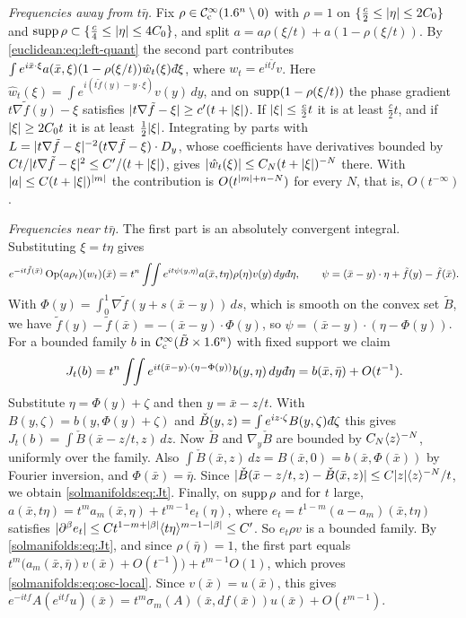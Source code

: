 \emph{Frequencies away from $t\bar\eta$.} Fix $\rho\in\mathcal{C}^\infty_{\mathrm{c}}(1.6^n\setminus0)$ with $\rho=1$ on
$\{\frac c2\le\lvert \eta\rvert\le2C_0\}$ and $\operatorname{supp}\rho\subset\{\frac c4\le\lvert \eta\rvert\le4C_0\}$, and split
$a=a\rho(\xi/t)+a(1-\rho(\xi/t))$. By \eqref{euclidean:eq:left-quant} the second part
contributes $\int e^{i\bar x\cdot\xi}a(\bar x,\xi)(1-\rho(\xi/t))\hat w_t(\xi)\,\dbar\xi$, where
$w_t=e^{it\tilde f}v$. Here $\hat w_t(\xi)=\int e^{i(t\tilde f(y)-y\cdot\xi)}v(y)\,dy$, and on
$\operatorname{supp}(1-\rho(\xi/t))$ the phase gradient $t\nabla \tilde f(y)-\xi$ satisfies
$\lvert t\nabla \tilde f-\xi\rvert\ge c'(t+\lvert \xi\rvert)$. If $\lvert \xi\rvert\le\frac c2t$ it is at least $\frac c2t$, and if
$\lvert \xi\rvert\ge2C_0t$ it is at least $\frac12\lvert \xi\rvert$. Integrating by parts with
$L=\lvert t\nabla \tilde f-\xi\rvert^{-2}(t\nabla \tilde f-\xi)\cdot D_y$, whose coefficients have derivatives
bounded by $Ct/\lvert t\nabla \tilde f-\xi\rvert^2\le C'/(t+\lvert \xi\rvert)$, gives
$\lvert \hat w_t(\xi)\rvert\le C_N(t+\lvert \xi\rvert)^{-N}$ there. With $\lvert a\rvert\le C(t+\lvert \xi\rvert)^{\lvert m\rvert}$ the
contribution is $O(t^{\lvert m\rvert+n-N})$ for every $N$, that is, $O(t^{-\infty})$.

\emph{Frequencies near $t\bar\eta$.} The first part is an absolutely convergent integral.
Substituting $\xi=t\eta$ gives
\begin{equation*}
e^{-it\tilde f(\bar x)}\Op(a\rho_t)(w_t)(\bar x)=t^n\int\!\!\int e^{it\psi(y,\eta)}a(\bar x,t\eta)\rho(\eta)v(y)\,dy\,\dbar\eta,
\qquad\psi=(\bar x-y)\cdot\eta+\tilde f(y)-\tilde f(\bar x).
\end{equation*}
With $\Phi(y)=\int_0^1\nabla \tilde f(y+s(\bar x-y))\,ds$, which is smooth on the convex set $\tilde B$,
we have $\tilde f(y)-\tilde f(\bar x)=-(\bar x-y)\cdot\Phi(y)$, so $\psi=(\bar x-y)\cdot(\eta-\Phi(y))$. For a
bounded family $b$ in $\mathcal{C}^\infty_{\mathrm{c}}(\tilde B\times1.6^n)$ with fixed support we claim
\begin{equation}\label{solmanifolds:eq:Jt}
J_t(b)=t^n\int\!\!\int e^{it(\bar x-y)\cdot(\eta-\Phi(y))}b(y,\eta)\,dy\,\dbar\eta=b(\bar x,\bar\eta)+O(t^{-1}).
\end{equation}
Substitute $\eta=\Phi(y)+\zeta$ and then $y=\bar x-z/t$. With $B(y,\zeta)=b(y,\Phi(y)+\zeta)$ and
$\check B(y,z)=\int e^{iz\cdot\zeta}B(y,\zeta)\,\dbar\zeta$ this gives
$J_t(b)=\int\check B(\bar x-z/t,z)\,dz$. Now $\check B$ and $\nabla_y\check B$ are bounded by
$C_N\langle z\rangle^{-N}$, uniformly over the family. Also $\int\check B(\bar x,z)\,dz=B(\bar x,0)=b(\bar x,\Phi(\bar x))$
by Fourier inversion, and $\Phi(\bar x)=\bar\eta$. Since
$\lvert \check B(\bar x-z/t,z)-\check B(\bar x,z)\rvert\le C\lvert z\rvert\langle z\rangle^{-N}/t$, we obtain
\eqref{solmanifolds:eq:Jt}. Finally, on $\operatorname{supp}\rho$ and for $t$ large,
$a(\bar x,t\eta)=t^ma_m(\bar x,\eta)+t^{m-1}e_t(\eta)$, where
$e_t=t^{1-m}(a-a_m)(\bar x,t\eta)$ satisfies
$\lvert \partial^\beta e_t\rvert\le Ct^{1-m+\lvert \beta\rvert}\langle t\eta\rangle^{m-1-\lvert \beta\rvert}\le C'$. So $e_t\rho v$ is a bounded
family. By \eqref{solmanifolds:eq:Jt}, and since $\rho(\bar\eta)=1$, the first part equals
$t^m\big(a_m(\bar x,\bar\eta)v(\bar x)+O(t^{-1})\big)+t^{m-1}O(1)$, which proves
\eqref{solmanifolds:eq:osc-local}. Since $v(\bar x)=u(\bar x)$, this gives
$e^{-itf}A(e^{itf}u)(\bar x)=t^m\sigma_m(A)(\bar x,df(\bar x))u(\bar x)+O(t^{m-1})$.

